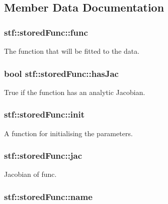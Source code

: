\subsection{Member Data Documentation}
\hypertarget{structstf_1_1storedFunc_a3ec6459b20161c0331f69902d219e5f4}{
\subsubsection[{func}]{ {\bf stf::storedFunc::func}}}
\label{structstf_1_1storedFunc_a3ec6459b20161c0331f69902d219e5f4}
The function that will be fitted to the data. \hypertarget{structstf_1_1storedFunc_a26a0e3f68ef57d72e5fd8e967dc15911}{
\subsubsection[{hasJac}]{\setlength{\rightskip}{0pt plus 5cm}bool {\bf stf::storedFunc::hasJac}}}
\label{structstf_1_1storedFunc_a26a0e3f68ef57d72e5fd8e967dc15911}
True if the function has an analytic Jacobian. \hypertarget{structstf_1_1storedFunc_a825fd7a72e67915cde6439afe8010840}{
\subsubsection[{init}]{ {\bf stf::storedFunc::init}}}
\label{structstf_1_1storedFunc_a825fd7a72e67915cde6439afe8010840}
A function for initialising the parameters. \hypertarget{structstf_1_1storedFunc_a5f97002993f83f9c162e2a9fde8125ea}{
\subsubsection[{jac}]{ {\bf stf::storedFunc::jac}}}
\label{structstf_1_1storedFunc_a5f97002993f83f9c162e2a9fde8125ea}
Jacobian of func. \hypertarget{structstf_1_1storedFunc_ac1fe235432b5de9f93817a573b6d9946}{
\subsubsection[{name}]{ {\bf stf::storedFunc::name}}}
